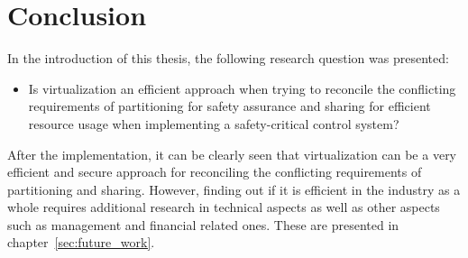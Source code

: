 \section{Conclusion}
In the introduction of this thesis, the following research question was presented:

\begin{itemize}
\item Is virtualization an efficient approach when trying to reconcile the conflicting requirements of partitioning for safety assurance and sharing for efficient resource usage when implementing a safety-critical control system?
\end{itemize}

After the implementation, it can be clearly seen that virtualization can be a very efficient and secure approach for reconciling the conflicting requirements of partitioning and sharing. However, finding out if it is efficient in the industry as a whole requires additional research in technical aspects as well as other aspects such as management and financial related ones. These are presented in chapter~\ref{sec:future_work}.
